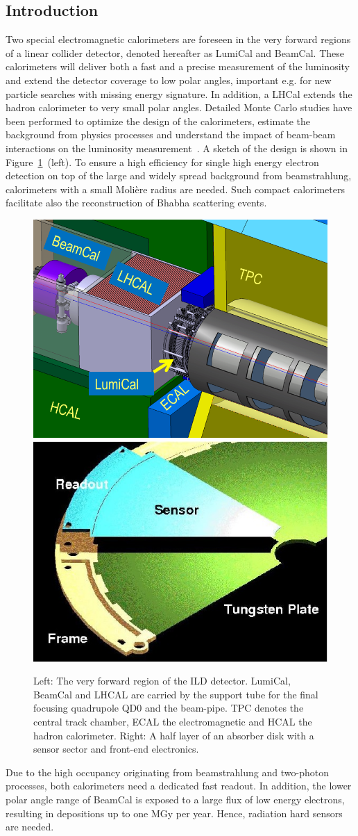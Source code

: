 \subsection{Introduction}
Two special electromagnetic calorimeters are foreseen in the very forward regions of a linear collider detector, denoted hereafter as
LumiCal and BeamCal.
These calorimeters will deliver both a fast and a precise measurement of the luminosity
and extend the detector coverage to low polar angles,
important e.g. for new particle searches with missing energy signature.
In addition, a LHCal extends the hadron calorimeter to very small polar angles.
Detailed Monte Carlo studies have been performed to
optimize the design of the calorimeters, estimate the background from physics processes and understand the impact
of beam-beam interactions on the luminosity measurement~\cite{2010JInst...512002A}.
A sketch of the design is shown in Figure~\ref{fig:Forward_structure}~(left).
To ensure a high efficiency for single high energy electron detection on top of the large and widely spread
background from beamstrahlung, calorimeters with a small Moli\`{e}re radius are needed. Such compact calorimeters facilitate
also the reconstruction of Bhabha scattering events.
\begin{figure}[hbp]
  \centering
   \includegraphics[width=0.45\columnwidth]{Calorimeter/FCAL/figs/forward_region_new} \hfill
   \includegraphics[width=0.45\columnwidth]{Calorimeter/FCAL/figs/BClayer}
  \caption{Left: The very forward region of the ILD detector.
  LumiCal, BeamCal and LHCAL are carried by
  the support tube for the final focusing quadrupole QD0 and the beam-pipe.
  TPC denotes the central track chamber, ECAL the electromagnetic and
  HCAL the hadron calorimeter.
  Right: A half layer of an absorber disk with a sensor sector and front-end electronics.}
  \label{fig:Forward_structure}
\end{figure}
Due to the high occupancy originating from beamstrahlung and two-photon processes,
both calorimeters need a dedicated fast readout.
In addition, the lower polar angle range of BeamCal is exposed to a large flux
of low energy electrons, resulting in depositions up to one
MGy per year. Hence, radiation hard sensors are needed.

